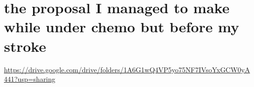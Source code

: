 \documentclass{article}
\begin{document}
\section{the proposal I managed to make while under chemo but before my stroke}
\url{https://drive.google.com/drive/folders/1A6G1wQ4VP5yo75NF7IVsoYxGCW0yA441?usp=sharing}
\end{document}
